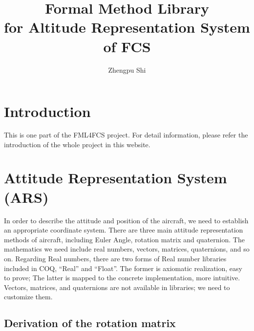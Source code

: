 \documentclass{article} %
\title{Formal Method Library \\for Altitude Representation System of FCS}
\author{Zhengpu Shi}
\affil{Draft V1.0}
\numberwithin{equation}{section} %
\begin{document}
\maketitle
\newpage

\tableofcontents
\newpage



\section{Introduction}
This is one part of the FML4FCS project. 
For detail information, please refer the introduction of the whole project in this website.


\newpage

\section{Attitude Representation System (ARS)}

In order to describe the attitude and position of the aircraft, we need to establish an appropriate coordinate system.
There are three main attitude representation methods of aircraft, including Euler Angle, rotation matrix and quaternion.
The mathematics we need include real numbers, vectors, matrices, quaternions, and so on.
Regarding Real numbers, there are two forms of Real number libraries included in COQ, ``Real'' and ``Float''.
The former is axiomatic realization, easy to prove; The latter is mapped to the concrete implementation, more intuitive.
Vectors, matrices, and quaternions are not available in libraries; we need to customize them.


\subsection{Derivation of the rotation matrix}
\end{document}
